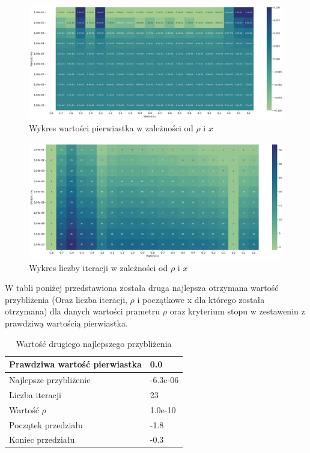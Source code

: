 \documentclass{article}
\begin{document}
\begin{figure}[H]
  \centering
  \begin{minipage}[b]{\textwidth}
    \includegraphics[width=\textwidth]{heatmap09.png}
  \end{minipage}
  \caption{Wykres wartości pierwiastka w zależności od \(\rho\) i \(x\)}
\end{figure}

\begin{figure}[H]
  \centering
  \begin{minipage}[b]{\textwidth}
    \includegraphics[width=\textwidth]{heatmap10.png}
  \end{minipage}
  \caption{Wykres liczby iteracji w zależności od \(\rho\) i \(x\)}
\end{figure}

\noindent
W tabli poniżej przedstawiona została druga najlepsza otrzymana wartość przybliżenia (Oraz liczba iteracji, \(\rho\) i początkowe x dla którego została otrzymana) dla danych wartości prametru \(\rho\) oraz kryterium stopu w zestaweniu z prawdziwą wartością pierwiastka.

\begin{table}[H]
    \centering
    \begin{tabular}{|l|l|}
    \hline
        Prawdziwa wartość pierwiastka & 0.0 \\ \hline
        Najlepsze przybliżenie & -6.3e-06 \\ \hline
        Liczba iteracji & 23 \\ \hline
        Wartość $\rho$ & 1.0e-10 \\ \hline
        Początek przedziału & -1.8 \\ \hline
        Koniec przedziału & -0.3 \\ \hline
    \end{tabular}
    \caption{Wartość drugiego najlepszego przybliżenia}
\end{table}
\end{document}
